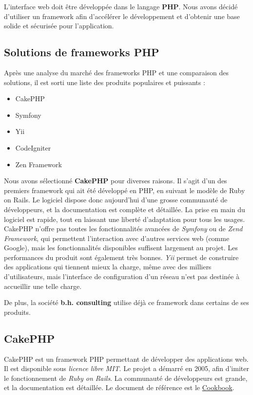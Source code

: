 \documentclass[10pt]{article}
\begin{document}
L'interface web doit être développée dans le langage \textbf{PHP}. Nous avons décidé d'utiliser un framework afin d'accélérer le développement et d'obtenir une base solide et sécurisée pour l'application.

\subsection{Solutions de frameworks PHP}
Après une analyse du marché des frameworks PHP et une comparaison des solutions, il est sorti une liste des produits populaires et puissants :
\begin{itemize}
    \item CakePHP
    \item Symfony
    \item Yii
    \item CodeIgniter
    \item Zen Framework
\end{itemize}



Nous avons sélectionné \textbf{CakePHP} pour diverses raisons. Il s'agit d'un des premiers framework qui ait été développé en PHP, en suivant le modèle de Ruby on Rails. Le logiciel dispose donc aujourd'hui d'une grosse communauté de développeurs, et la documentation est complète et détaillée. La prise en main du logiciel est rapide, tout en laissant une liberté d'adaptation pour tous les usages. CakePHP n'offre pas toutes les fonctionnalités avancées de \emph{Symfony} ou de \emph{Zend Framework}, qui permettent l'interaction avec d'autres services web (comme Google), mais les fonctionnalités disponibles suffisent largement au projet. Les performances du produit sont également très bonnes. \emph{Yii} permet de construire des applications qui tiennent mieux la charge, même avec des milliers d'utilisateurs, mais l'interface de configuration d'un réseau n'est pas destinée à accueillir une telle charge.


De plus, la société \textbf{b.h. consulting} utilise déjà ce framework dans certains de ses produits.


\subsection{CakePHP}
CakePHP est un framework PHP permettant de développer des applications web. Il est disponible sous \emph{licence libre MIT}. Le projet a démarré en 2005, afin d'imiter le fonctionnement de \emph{Ruby on Rails}. La communauté de développeurs est grande, et la documentation est détaillée. Le document de référence est le \href{http://book.cakephp.org/fr/view/876/The-Manual}{Cookbook}.
\end{document}
